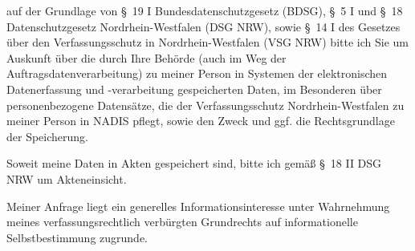 auf der Grundlage von §~19 I Bundesdatenschutzgesetz (BDSG),
§~5 I und §~18 Datenschutzgesetz Nordrhein-Westfalen (DSG NRW), sowie
§~14 I des Gesetzes über den Verfassungsschutz in Nordrhein-Westfalen (VSG NRW)
bitte ich Sie um Auskunft über die durch Ihre Behörde (auch im Weg der Auftragsdatenverarbeitung)
zu meiner Person in Systemen der elektronischen Datenerfassung und -verarbeitung
gespeicherten Daten, im Besonderen über personenbezogene Datensätze, die der
Verfassungsschutz Nordrhein-Westfalen zu meiner Person in NADIS pflegt, sowie den
Zweck und ggf. die Rechtsgrundlage der Speicherung.

Soweit meine Daten in Akten gespeichert sind, bitte ich gemäß §~18 II DSG NRW
um Akteneinsicht.

Meiner Anfrage liegt ein generelles Informationsinteresse unter Wahrnehmung
meines verfassungsrechtlich verbürgten Grundrechts auf informationelle
Selbstbestimmung zugrunde.
